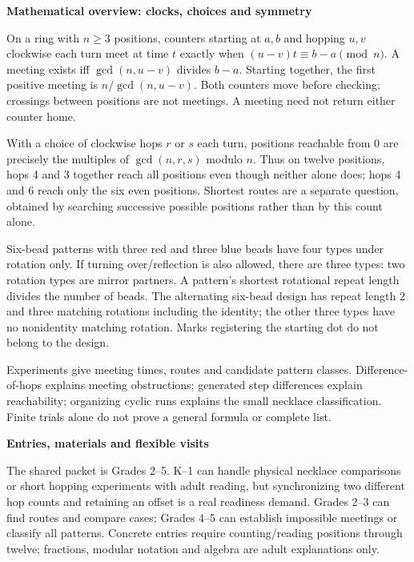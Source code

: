 \documentclass[11pt]{article}
\newcommand\lead[1]{\textbf{#1}\par}
\begin{document}
\lead{Mathematical overview: clocks, choices and symmetry}
On a ring with $n\ge3$ positions, counters starting at $a,b$ and hopping $u,v$ clockwise each turn meet at time $t$ exactly when $(u-v)t\equiv b-a\pmod n$. A meeting exists iff $\gcd(n,u-v)$ divides $b-a$. Starting together, the first positive meeting is $n/\gcd(n,u-v)$. Both counters move before checking; crossings between positions are not meetings. A meeting need not return either counter home.

With a choice of clockwise hops $r$ or $s$ each turn, positions reachable from 0 are precisely the multiples of $\gcd(n,r,s)$ modulo $n$. Thus on twelve positions, hops 4 and 3 together reach all positions even though neither alone does; hops 4 and 6 reach only the six even positions. Shortest routes are a separate question, obtained by searching successive possible positions rather than by this count alone.

Six-bead patterns with three red and three blue beads have four types under rotation only. If turning over/reflection is also allowed, there are three types: two rotation types are mirror partners. A pattern's shortest rotational repeat length divides the number of beads. The alternating six-bead design has repeat length 2 and three matching rotations including the identity; the other three types have no nonidentity matching rotation. Marks registering the starting dot do not belong to the design.

Experiments give meeting times, routes and candidate pattern classes. Difference-of-hops explains meeting obstructions; generated step differences explain reachability; organizing cyclic runs explains the small necklace classification. Finite trials alone do not prove a general formula or complete list.

\lead{Entries, materials and flexible visits}
The shared packet is Grades 2--5. K--1 can handle physical necklace comparisons or short hopping experiments with adult reading, but synchronizing two different hop counts and retaining an offset is a real readiness demand. Grades 2--3 can find routes and compare cases; Grades 4--5 can establish impossible meetings or classify all patterns. Concrete entries require counting/reading positions through twelve; fractions, modular notation and algebra are adult explanations only.
\end{document}
